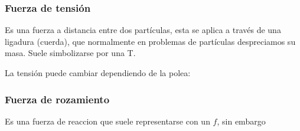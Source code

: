 \subsubsection*{Fuerza de tensión}
Es una fuerza a distancia entre dos partículas, esta se aplica a través de una ligadura (cuerda), que normalmente en problemas de partículas despreciamos su masa. Suele simbolizarse por una T.
\begin{figure}[H]
	\centering
\end{figure}
La tensión puede cambiar dependiendo de la polea:

\subsubsection*{Fuerza de rozamiento}
Es una fuerza de reaccion que suele representarse con un $f$, sin embargo
